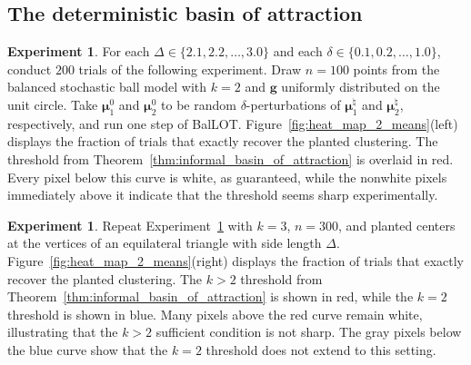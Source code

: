 \documentclass{article}
\theoremstyle{plain}
\theoremstyle{definition}
\newtheorem{experiment}[theorem]{Experiment}
\newcommand{\1}{\mathbf{1}}
\newcommand{\hmu}{\bm{\mu}^\natural}
\newcommand{\bmu}{\bm{\mu}}
\begin{document}

\subsection{The deterministic basin of attraction}
\label{sec: deterministic basin experiments}

\begin{experiment}
\label{exper.k=2}
For each $\Delta\in\{2.1,2.2,\ldots,3.0\}$ and each $\delta\in\{0.1,0.2,\ldots,1.0\}$, conduct $200$ trials of the following experiment.
Draw $n=100$ points from the balanced stochastic ball model with $k=2$ and $\bm{g}$ uniformly distributed on the unit circle.
Take $\bmu_1^0$ and $\bmu_2^0$ to be random $\delta$-perturbations of $\hmu_1$ and $\hmu_2$, respectively, and run one step of BalLOT.
Figure~\ref{fig:heat_map_2_means}(left) displays the fraction of trials that exactly recover the planted clustering.
The threshold from Theorem~\ref{thm:informal_basin_of_attraction} is overlaid in red.
Every pixel below this curve is white, as guaranteed, while the nonwhite pixels immediately above it indicate that the threshold seems sharp experimentally.
\end{experiment}

\begin{experiment}
\label{exper.k=3}
Repeat Experiment~\ref{exper.k=2} with $k=3$, $n=300$, and planted centers at the vertices of an equilateral triangle with side length $\Delta$.
Figure~\ref{fig:heat_map_2_means}(right) displays the fraction of trials that exactly recover the planted clustering.
The $k>2$ threshold from Theorem~\ref{thm:informal_basin_of_attraction} is shown in red, while the $k=2$ threshold is shown in blue.
Many pixels above the red curve remain white, illustrating that the $k>2$ sufficient condition is not sharp.
The gray pixels below the blue curve show that the $k=2$ threshold does not extend to this setting.
\end{experiment}
\end{document}
